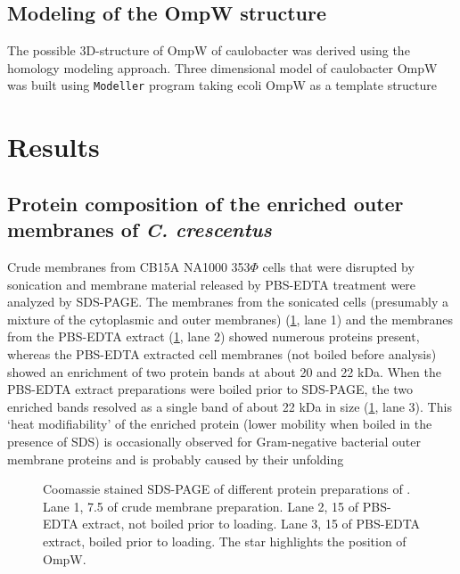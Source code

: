 \subsection{Modeling of the OmpW structure}
\label{sub:porin_modeling}
The possible 3D-structure of OmpW of \ac{caulobacter} was derived using the homology modeling approach. Three dimensional model of \ac{caulobacter} OmpW was built using \texttt{Modeller} program taking \ac{ecoli} OmpW as a template structure
 
\section{Results}

\subsection{Protein composition of the enriched outer membranes of \textit{C. crescentus}}
Crude membranes from \caulobacter CB15A NA1000 353$\Phi$ cells that were disrupted by sonication and membrane material released by \ac{PBS}-\ac{EDTA} treatment were analyzed by \ac{SDS-PAGE}. The membranes from the sonicated cells (presumably a mixture of the cytoplasmic and outer membranes) (\cref{fig:porin-pbsedtagel}, lane 1) and the membranes from the \ac{PBS}-\ac{EDTA} extract (\cref{fig:porin-pbsedtagel}, lane 2) showed numerous proteins present, whereas the \ac{PBS}-\ac{EDTA} extracted cell membranes (not boiled before analysis) showed an enrichment of two protein bands at about 20 and 22 kDa. When the \ac{PBS}-\ac{EDTA} extract preparations were boiled prior to \ac{SDS-PAGE}, the two enriched bands resolved as a single band of about 22 kDa in size (\cref{fig:porin-pbsedtagel}, lane 3). This `heat modifiability' of the enriched protein (\ie lower mobility when boiled in the presence of \textsc{SDS}) is occasionally observed for Gram-negative bacterial outer membrane proteins and is probably caused by their unfolding

\begin{figure}[htb]
  	\begin{center}
   	\end{center}
   	\caption[Coomassie stained \ac{SDS-PAGE} of different protein preparations of \caulobacter.]{
	   	Coomassie stained \ac{SDS-PAGE} of different protein preparations of \caulobacter. 
Lane 1, 7.5 \microlitre of crude membrane preparation. Lane 2, 15 \microlitre of \ac{PBS}-\ac{EDTA} extract, not boiled prior to loading. Lane 3, 15 \microlitre of \ac{PBS}-\ac{EDTA} extract, boiled prior to loading. The star highlights the position of OmpW.
   	}
   	\label{fig:porin-pbsedtagel}
\end{figure}   

